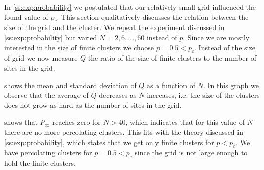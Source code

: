 
In \cref{ss:exp:probability} we postulated that our relatively small grid influenced the found value of $p_c$. This section qualitatively discusses the relation between the size of the grid and the cluster. We repeat the experiment discussed in \cref{ss:exp:probability} but varied $N = 2, 6, \dotsc, 60$ instead of $p$. Since we are mostly interested in the size of finite clusters we choose $p = 0.5 < p_c$. Instead of the size of grid we now measure $Q$ the ratio of the size of finite clusters to the number of sites in the grid. 

 shows the mean and standard deviation of $Q$ as a function of $N$. In this graph we observe that the average of $Q$ decreases as $N$ increases, i.e. the size of the clusters does not grow as hard as the number of sites in the grid.  

 shows that $P_\infty$ reaches zero for $N > 40$, which indicates that for this value of $N$ there are no more percolating clusters. This fits with the theory discussed in \cref{ss:exp:probability}, which states that we get only finite clusters for $p < p_c$. We have percolating clusters for $p = 0.5 < p_c$ since the grid is not large enough to hold the finite clusters.\\ 

